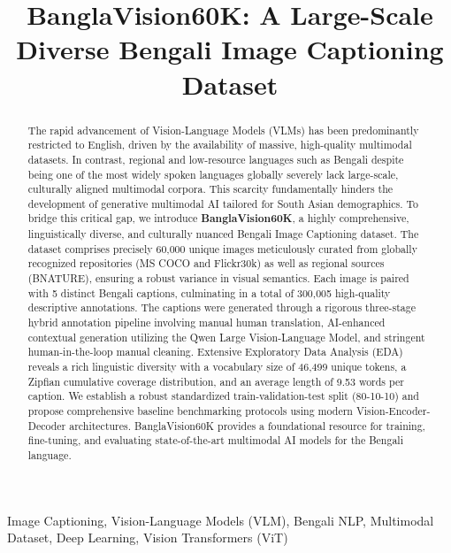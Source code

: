 \documentclass[conference]{IEEEtran}
\begin{document}
\title{BanglaVision60K: A Large-Scale Diverse Bengali Image Captioning Dataset}


\maketitle

\begin{abstract}
The rapid advancement of Vision-Language Models (VLMs) has been predominantly restricted to English, driven by the availability of massive, high-quality multimodal datasets. In contrast, regional and low-resource languages such as Bengali despite being one of the most widely spoken languages globally severely lack large-scale, culturally aligned multimodal corpora. This scarcity fundamentally hinders the development of generative multimodal AI tailored for South Asian demographics. To bridge this critical gap, we introduce \textbf{BanglaVision60K}, a highly comprehensive, linguistically diverse, and culturally nuanced Bengali Image Captioning dataset. The dataset comprises precisely 60,000 unique images meticulously curated from globally recognized repositories (MS COCO and Flickr30k) as well as regional sources (BNATURE), ensuring a robust variance in visual semantics. Each image is paired with 5 distinct Bengali captions, culminating in a total of 300,005 high-quality descriptive annotations. The captions were generated through a rigorous three-stage hybrid annotation pipeline involving manual human translation, AI-enhanced contextual generation utilizing the Qwen Large Vision-Language Model, and stringent human-in-the-loop manual cleaning. Extensive Exploratory Data Analysis (EDA) reveals a rich linguistic diversity with a vocabulary size of 46,499 unique tokens, a Zipfian cumulative coverage distribution, and an average length of 9.53 words per caption. We establish a robust standardized train-validation-test split (80-10-10) and propose comprehensive baseline benchmarking protocols using modern Vision-Encoder-Decoder architectures. BanglaVision60K provides a foundational resource for training, fine-tuning, and evaluating state-of-the-art multimodal AI models for the Bengali language.
\end{abstract}

\begin{IEEEkeywords}
Image Captioning, Vision-Language Models (VLM), Bengali NLP, Multimodal Dataset, Deep Learning, Vision Transformers (ViT)
\end{IEEEkeywords}
\end{document}
